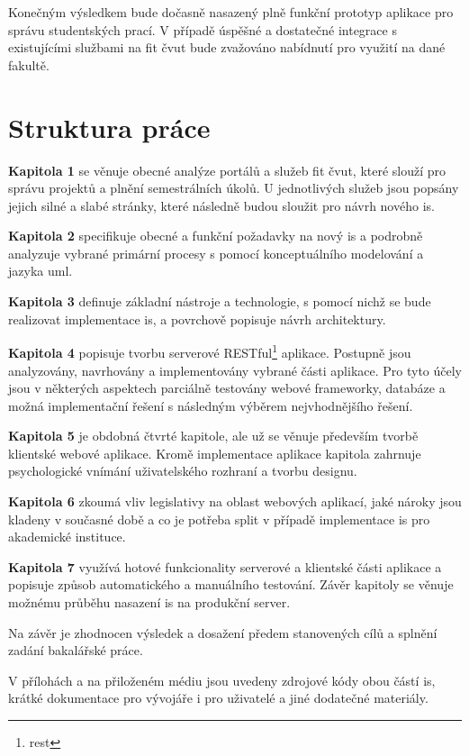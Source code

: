 Konečným výsledkem bude dočasně nasazený plně funkční prototyp aplikace pro správu studentských prací. V případě úspěšné a dostatečné integrace s existujícími službami na \gls{fit} \gls{čvut} bude zvažováno nabídnutí pro využití na dané fakultě.



\clearpage
\section{Struktura práce}

\textbf{Kapitola 1} se věnuje obecné analýze portálů a služeb \gls{fit} \gls{čvut}, které slouží pro správu projektů a plnění semestrálních úkolů. U jednotlivých služeb jsou popsány jejich silné a slabé stránky, které následně budou sloužit pro návrh nového \gls{is}.

\textbf{Kapitola 2} specifikuje obecné a funkční požadavky na nový \gls{is} a podrobně analyzuje vybrané primární procesy s pomocí konceptuálního modelování a jazyka \gls{uml}.

\textbf{Kapitola 3} definuje základní nástroje a technologie, s pomocí nichž se bude realizovat implementace \gls{is}, a povrchově popisuje návrh architektury.

\textbf{Kapitola 4} popisuje tvorbu serverové RESTful\footnote{\gls{rest}} aplikace. Postupně jsou analyzovány, navrhovány a implementovány vybrané části aplikace. Pro tyto účely jsou v některých aspektech parciálně testovány webové frameworky, databáze a možná implementační řešení s následným výběrem nejvhodnějšího řešení.

\textbf{Kapitola 5} je obdobná čtvrté kapitole, ale už se věnuje především tvorbě klientské webové aplikace. Kromě implementace aplikace kapitola zahrnuje psychologické vnímání uživatelského rozhraní a tvorbu designu.

\textbf{Kapitola 6} zkoumá vliv legislativy na oblast webových aplikací, jaké nároky jsou kladeny v současné době a co je potřeba split v případě implementace \gls{is} pro akademické instituce.

\textbf{Kapitola 7} využívá hotové funkcionality serverové a klientské části aplikace a popisuje způsob automatického a manuálního testování. Závěr kapitoly se věnuje možnému průběhu nasazení \gls{is} na produkční server.

Na závěr je zhodnocen výsledek a dosažení předem stanovených cílů a splnění zadání bakalářské práce.

V přílohách a na přiloženém médiu jsou uvedeny zdrojové kódy obou částí \gls{is}, krátké dokumentace pro vývojáře i pro uživatelé a jiné dodatečné materiály.